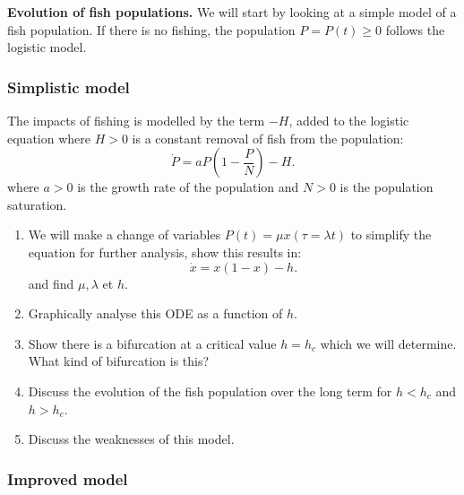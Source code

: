 \documentclass{article}
\begin{document}
\begin{question}
  \textbf{Evolution of fish populations.} We will start by looking at a simple model of a fish population. If there is no fishing, the population $P=P(t)\geqslant 0$ follows the logistic model.
  
  \subsubsection*{Simplistic model}
  
  The impacts of fishing is modelled by the term $-H$, added to the logistic equation where $H>0$ is a constant removal of fish from the population:
  \begin{equation}
    \label{eqn:LogisticHarvesting}
    \dot P = a P\left(1-\frac{P}{N}\right)-H.
  \end{equation}
  where $a>0$ is the growth rate of the population and $N>0$ is the population saturation.

\begin{enumerate}[label=(\alph*)]
  \item We will make a change of variables $P(t) = \mu x(\tau = \lambda t)$ to simplify the equation for further analysis, show this results in:
  \begin{equation}
    \dot x = x(1-x) -h.
  \end{equation}
  and find $\mu,\lambda$ et $h$.
  \item Graphically analyse this ODE as a function of $h$.
  \item Show there is a bifurcation at a critical value $h=h_c$ which we will determine. What kind of bifurcation is this?
  \item Discuss the evolution of the fish population over the long term for $h<h_c$ and $h>h_c$. 
  \item Discuss the weaknesses of this model.
\end{enumerate}

\subsubsection*{Improved model}


\end{question}
\end{document}
